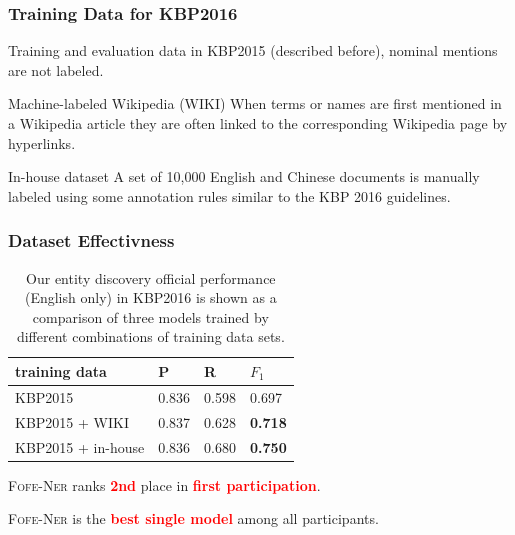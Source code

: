 \documentclass{beamer}
\begin{document}
\begin{frame}
\frametitle{Training Data for KBP2016}
\begin{block}{Training and evaluation data in KBP2015}
	(described before), nominal mentions are not labeled.
\end{block}
\begin{block}{Machine-labeled Wikipedia (WIKI)}
	When terms or names are first mentioned in a Wikipedia article they are often linked to the corresponding Wikipedia page by hyperlinks. 
\end{block} 
\begin{block}{In-house dataset}
	A set of 10,000 English and Chinese documents is manually labeled using some annotation rules similar to the KBP 2016 guidelines.
\end{block}
\end{frame}


\begin{frame}
\frametitle{Dataset Effectivness}
\begin{table}
	\centering
	\begin{tabular}{|l|ll|l|}
		\hline
		training data & P  & R & $F_1$ \\ \hline \hline
		KBP2015 & 0.836 & 0.598 & 0.697 \\
		KBP2015 + WIKI &  0.837 & 0.628 & \bf 0.718 \\
		KBP2015 + in-house & 0.836 & 0.680 & \bf 0.750 \\ 
		\hline
	\end{tabular}
	\caption{\scriptsize Our entity discovery official performance (English only) in KBP2016 is shown as a comparison of three models trained by different combinations of training data sets. }
	\label{tbl:kbp2016dataset}	
\end{table}
\begin{alertblock}{}
	\small
	\textsc{Fofe-Ner} ranks \textcolor{red}{\textbf{2nd}} place in \textcolor{red}{\textbf{first participation}}.
\end{alertblock}
\begin{alertblock}{}
	\small
	\textsc{Fofe-Ner} is the \textcolor{red}{\textbf{best single model}} among all participants.
\end{alertblock}
\end{frame}
\end{document}
